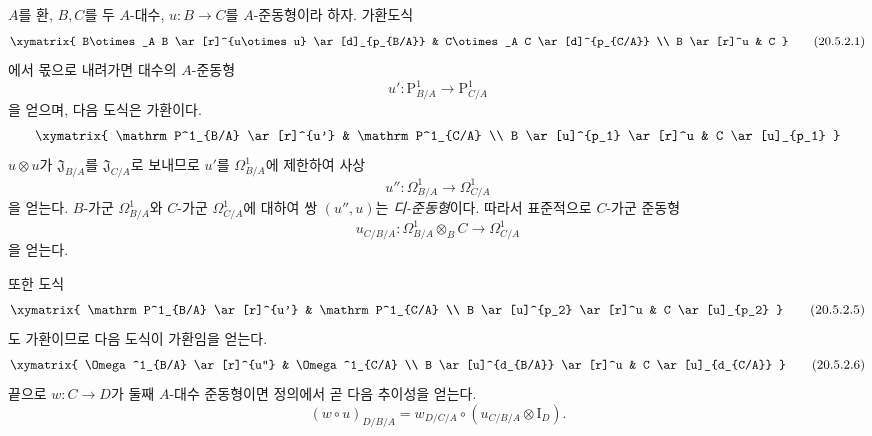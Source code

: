 \begin{env}[20.5.2]
\label{0.20.5.2-ko}
$A$를 환, $B,C$를 두 $A$-대수,
$u:B\to C$를 $A$-준동형이라 하자. 가환도식
\[
\xymatrix{
  B\otimes_A B \ar[r]^{u\otimes u} \ar[d]_{p_{B/A}} &
  C\otimes_A C \ar[d]^{p_{C/A}} \\
  B \ar[r]^u & C
}
\tag{20.5.2.1}
\label{0.20.5.2.1-ko}
\]
에서 몫으로 내려가면 대수의 $A$-준동형
\begin{equation}
\tag{20.5.2.2}
\label{0.20.5.2.2-ko}
  u':\mathrm P^1_{B/A}\to\mathrm P^1_{C/A}
\end{equation}
을 얻으며, 다음 도식은 가환이다.
\[
\xymatrix{
  \mathrm P^1_{B/A} \ar[r]^{u'} & \mathrm P^1_{C/A} \\
  B \ar[u]^{p_1} \ar[r]^u & C \ar[u]_{p_1}
}
\]
$u\otimes u$가 $\mathfrak J_{B/A}$를 $\mathfrak J_{C/A}$로
보내므로 $u'$를 $\Omega^1_{B/A}$에 제한하여 사상
\begin{equation}
\tag{20.5.2.3}
\label{0.20.5.2.3-ko}
  u'':\Omega^1_{B/A}\to\Omega^1_{C/A}
\end{equation}
을 얻는다. $B$-가군 $\Omega^1_{B/A}$와 $C$-가군
$\Omega^1_{C/A}$에 대하여 쌍 $(u'',u)$는 \emph{디-준동형}이다.
따라서 표준적으로 $C$-가군 준동형
\begin{equation}
\tag{20.5.2.4}
\label{0.20.5.2.4-ko}
  u_{C/B/A}:\Omega^1_{B/A}\otimes_B C\to\Omega^1_{C/A}
\end{equation}
을 얻는다.

또한 도식
\[
\xymatrix{
  \mathrm P^1_{B/A} \ar[r]^{u'} & \mathrm P^1_{C/A} \\
  B \ar[u]^{p_2} \ar[r]^u & C \ar[u]_{p_2}
}
\tag{20.5.2.5}
\label{0.20.5.2.5-ko}
\]
도 가환이므로 다음 도식이 가환임을 얻는다.
\[
\xymatrix{
  \Omega^1_{B/A} \ar[r]^{u''} & \Omega^1_{C/A} \\
  B \ar[u]^{d_{B/A}} \ar[r]^u & C \ar[u]_{d_{C/A}}
}
\tag{20.5.2.6}
\label{0.20.5.2.6-ko}
\]
끝으로 $w:C\to D$가 둘째 $A$-대수 준동형이면 정의에서 곧 다음
추이성을 얻는다.
\begin{equation}
\tag{20.5.2.7}
\label{0.20.5.2.7-ko}
  (w\circ u)_{D/B/A}
  =w_{D/C/A}\circ
  (u_{C/B/A}\otimes\mathrm I_D).
\end{equation}
\end{env}

